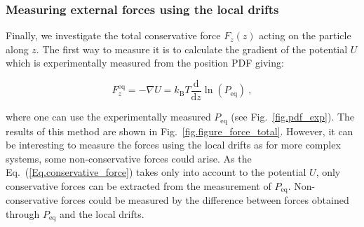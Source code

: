 \subsubsection{Measuring external forces using the local drifts}
\label{sec:force}
Finally, we investigate the total conservative force $F_z(z)$ acting on the particle along $z$. The first way to measure it is to calculate the gradient of the potential $U$ which is experimentally measured from the position \gls{PDF} giving:


\begin{equation}
	F_z^\mathrm{eq} = -\nabla U = k_\mathrm{B}T \frac{\mathrm{d}}{\mathrm{d} z} \ln (P_\mathrm{eq}) ~,
	\label{Eq.conservative_force}
\end{equation}

where one can use the experimentally measured $P_\mathrm{eq}$ (see Fig.~\ref{fig.pdf_exp}). The results of this method are shown in Fig.~\ref{fig.figure_force_total}. However, it can be interesting to measure the forces using the local drifts as for more complex systems, some non-conservative forces could arise. As the Eq.~(\ref{Eq.conservative_force}) takes only into account to the potential $U$, only conservative forces can be extracted from the measurement of $P_\mathrm{eq}$. Non-conservative forces could be measured by the difference between forces obtained through $P_\mathrm{eq}$ and the local drifts.  


